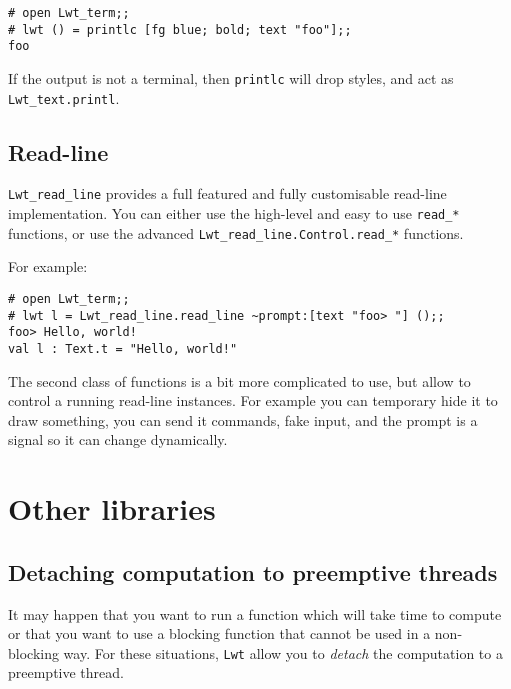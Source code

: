 \lstset{language=[Objective]Caml}\begin{lstlisting}
# open Lwt_term;;
# lwt () = printlc [fg blue; bold; text "foo"];;
foo

\end{lstlisting}
If the output is not a terminal, then {\tt printlc} will drop
styles, and act as {\tt Lwt\_text.printl}.



\subsection{ Read-line }

{\tt Lwt\_read\_line} provides a full featured and fully
customisable read-line implementation. You can either use the
high-level and easy to use {\tt read\_*} functions, or use the
advanced {\tt Lwt\_read\_line.Control.read\_*} functions.



For example:



\lstset{language=[Objective]Caml}\begin{lstlisting}
# open Lwt_term;;
# lwt l = Lwt_read_line.read_line ~prompt:[text "foo> "] ();;
foo> Hello, world!
val l : Text.t = "Hello, world!"

\end{lstlisting}
The second class of functions is a bit more complicated to use, but
allow to control a running read-line instances. For example you can
temporary hide it to draw something, you can send it commands, fake
input, and the prompt is a signal so it can change dynamically.



\section{ Other libraries }

\subsection{ Detaching computation to preemptive threads }

It may happen that you want to run a function which will take time to
compute or that you want to use a blocking function that cannot be
used in a non-blocking way. For these situations, {\tt Lwt} allow you to
\emph{detach} the computation to a preemptive thread.



